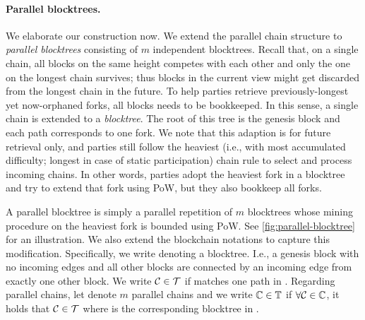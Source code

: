\paragraph{Parallel blocktrees.}
%
We elaborate our construction now.
%
We extend the parallel chain structure to \emph{parallel blocktrees} consisting of $m$ independent blocktrees.
%
Recall that, on a single chain, all blocks on the same height competes with each other and only the one on the longest chain survives; thus blocks in the current view might get discarded from the longest chain in the future.
%
To help parties retrieve previously-longest yet now-orphaned forks, all blocks needs to be bookkeeped.
%
In this sense, a single chain is extended to a \emph{blocktree}.
%
The root of this tree is the genesis block and each path corresponds to one fork.
%
We note that this adaption is for future retrieval only, and parties still follow the heaviest (i.e., with most accumulated difficulty; longest in case of static participation) chain rule to select and process incoming chains.
%
In other words, parties adopt the heaviest fork in a blocktree and try to extend that fork using PoW, but they also bookkeep all forks.

A parallel blocktree is simply a parallel repetition of $m$ blocktrees whose mining procedure on the heaviest fork is bounded using \mforone PoW.
%
See \cref{fig:parallel-blocktree} for an illustration.
%
We also extend the blockchain notations to capture this modification.
%
Specifically, we write \blockTree denoting a blocktree.
%
I.e., a genesis block with no incoming edges and all other blocks are connected by an incoming edge from exactly one other block.
%
We write $\mathcal{C} \in \mathcal{T}$ if \chain matches one path in \blockTree.
%
Regarding parallel chains, let \parallelTrees denote $m$ parallel chains and we write $\mathbb{C} \in \mathbb{T}$ if $\forall \mathcal{C} \in \mathbb{C}$, it holds that $\mathcal{C} \in \mathcal{T}$ where \blockTree is the corresponding blocktree in \parallelTrees.



